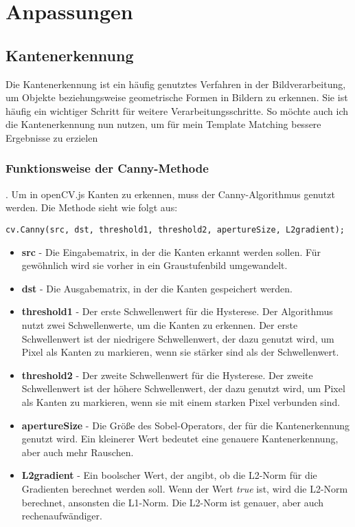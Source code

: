 \section{Anpassungen}

\subsection{Kantenerkennung}
Die Kantenerkennung ist ein häufig genutztes Verfahren in der Bildverarbeitung, um Objekte beziehungsweise geometrische Formen in Bildern zu erkennen. Sie ist häufig ein wichtiger Schritt für weitere Verarbeitungsschritte. So möchte auch ich die Kantenerkennung nun nutzen, um für mein Template Matching bessere Ergebnisse zu erzielen

\subsubsection{Funktionsweise der Canny-Methode}.
Um in openCV.js Kanten zu erkennen, muss der Canny-Algorithmus genutzt werden. Die Methode sieht wie folgt aus:
\begin{lstlisting}[style=JavaScript]
cv.Canny(src, dst, threshold1, threshold2, apertureSize, L2gradient);
\end{lstlisting}

\begin{itemize}
    \item \textbf{src} - Die Eingabematrix, in der die Kanten erkannt werden sollen. Für gewöhnlich wird sie vorher in ein Graustufenbild umgewandelt.
    \item \textbf{dst} - Die Ausgabematrix, in der die Kanten gespeichert werden.
    \item \textbf{threshold1} - Der erste Schwellenwert für die Hysterese. Der Algorithmus nutzt zwei Schwellenwerte, um die Kanten zu erkennen. Der erste Schwellenwert ist der niedrigere Schwellenwert, der dazu genutzt wird, um Pixel als Kanten zu markieren, wenn sie stärker sind als der Schwellenwert.
    \item \textbf{threshold2} - Der zweite Schwellenwert für die Hysterese. Der zweite Schwellenwert ist der höhere Schwellenwert, der dazu genutzt wird, um Pixel als Kanten zu markieren, wenn sie mit einem starken Pixel verbunden sind.
    \item \textbf{apertureSize} - Die Größe des Sobel-Operators, der für die Kantenerkennung genutzt wird. Ein kleinerer Wert bedeutet eine genauere Kantenerkennung, aber auch mehr Rauschen.
    \item \textbf{L2gradient} - Ein boolscher Wert, der angibt, ob die L2-Norm für die Gradienten berechnet werden soll. Wenn der Wert \textit{true} ist, wird die L2-Norm berechnet, ansonsten die L1-Norm. Die L2-Norm ist genauer, aber auch rechenaufwändiger.
\end{itemize}

